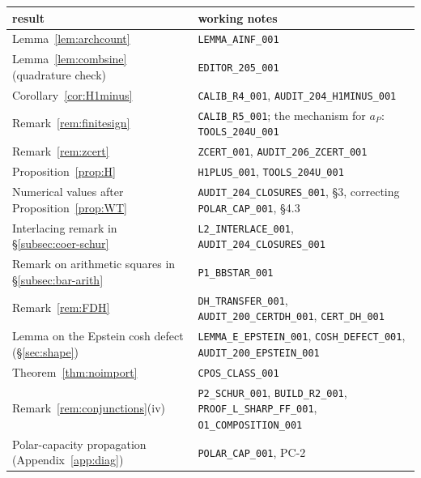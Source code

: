 \documentclass[11pt]{amsart}
\theoremstyle{definition}
\theoremstyle{remark}
\begin{document}
\begin{center}\small
\begin{tabularx}{\textwidth}{@{}lY@{}}
\toprule
result & working notes\\
\midrule
Lemma~\ref{lem:archcount} & \texttt{LEMMA\_AINF\_001}\\
Lemma~\ref{lem:combsine} (quadrature check) & \texttt{EDITOR\_205\_001}\\
Corollary~\ref{cor:H1minus} & \texttt{CALIB\_R4\_001}, \texttt{AUDIT\_204\_H1MINUS\_001}\\
Remark~\ref{rem:finitesign} & \texttt{CALIB\_R5\_001}; the mechanism for $a_P$: \texttt{TOOLS\_204U\_001}\\
Remark~\ref{rem:zcert} & \texttt{ZCERT\_001}, \texttt{AUDIT\_206\_ZCERT\_001}\\
Proposition~\ref{prop:H} & \texttt{H1PLUS\_001}, \texttt{TOOLS\_204U\_001}\\
Numerical values after Proposition~\ref{prop:WT} & \texttt{AUDIT\_204\_CLOSURES\_001}, \S3, correcting \texttt{POLAR\_CAP\_001}, \S4.3\\
Interlacing remark in \S\ref{subsec:coer-schur} & \texttt{L2\_INTERLACE\_001}, \texttt{AUDIT\_204\_CLOSURES\_001}\\
Remark on arithmetic squares in \S\ref{subsec:bar-arith} & \texttt{P1\_BBSTAR\_001}\\
Remark~\ref{rem:FDH} & \texttt{DH\_TRANSFER\_001}, \texttt{AUDIT\_200\_CERTDH\_001}, \texttt{CERT\_DH\_001}\\
Lemma on the Epstein cosh defect (\S\ref{sec:shape}) & \texttt{LEMMA\_E\_EPSTEIN\_001}, \texttt{COSH\_DEFECT\_001}, \texttt{AUDIT\_200\_EPSTEIN\_001}\\
Theorem~\ref{thm:noimport} & \texttt{CPOS\_CLASS\_001}\\
Remark~\ref{rem:conjunctions}(iv) & \texttt{P2\_SCHUR\_001}, \texttt{BUILD\_R2\_001}, \texttt{PROOF\_L\_SHARP\_FF\_001}, \texttt{O1\_COMPOSITION\_001}\\
Polar-capacity propagation (Appendix~\ref{app:diag}) & \texttt{POLAR\_CAP\_001}, PC-2\\
\bottomrule
\end{tabularx}
\end{center}
\end{document}
